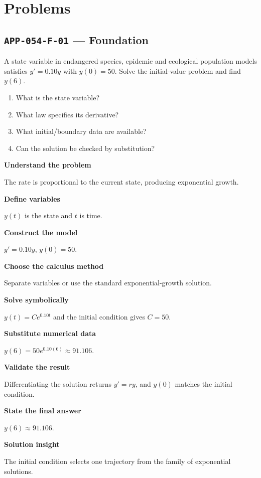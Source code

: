 \documentclass[11pt]{book}
\newcommand{\pid}[1]{\texttt{#1}}
\begin{document}
\section*{Problems}
\subsection*{\pid{APP-054-F-01} — Foundation}
\begin{problembox}
A state variable in endangered species, epidemic and ecological population models satisfies $y'=0.10y$ with $y(0)=50$. Solve the initial-value problem and find $y(6)$.
\end{problembox}
\begin{promptbox}\begin{enumerate}
\item What is the state variable?
\item What law specifies its derivative?
\item What initial/boundary data are available?
\item Can the solution be checked by substitution?
\end{enumerate}\end{promptbox}
\begin{solutionbox}
\textbf{Understand the problem}\par The rate is proportional to the current state, producing exponential growth.\par\medskip
\textbf{Define variables}\par $y(t)$ is the state and $t$ is time.\par\medskip
\textbf{Construct the model}\par $y'=0.10y$, $y(0)=50$.\par\medskip
\textbf{Choose the calculus method}\par Separate variables or use the standard exponential-growth solution.\par\medskip
\textbf{Solve symbolically}\par $y(t)=Ce^{0.10t}$ and the initial condition gives $C=50$.\par\medskip
\textbf{Substitute numerical data}\par $y(6)=50e^{0.10(6)}\approx 91.106$.\par\medskip
\textbf{Validate the result}\par Differentiating the solution returns $y'=ry$, and $y(0)$ matches the initial condition.\par\medskip
\textbf{State the final answer}\par $y(6)\approx 91.106$.\par\medskip
\textbf{Solution insight}\par The initial condition selects one trajectory from the family of exponential solutions.\par\medskip
\end{solutionbox}
\end{document}
